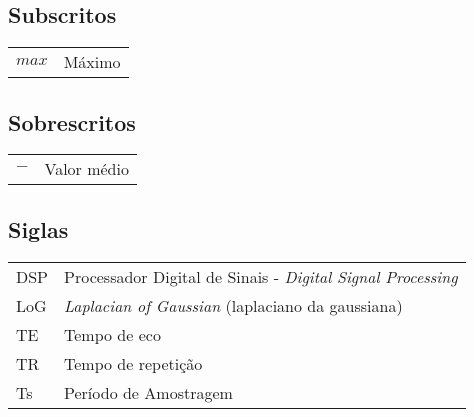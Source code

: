 \subsection*{Subscritos}

\begin{tabular}{p{}p{}}
$max$	& Máximo \\

\end{tabular}

\subsection*{Sobrescritos}

\begin{tabular}{p{}p{}}
$-$	& Valor médio
\end{tabular}

\subsection*{Siglas}

\begin{tabular}{p{}p{}}

DSP & Processador Digital de Sinais - \textit{Digital Signal Processing}\\
LoG	& \textit{Laplacian of Gaussian} (laplaciano da gaussiana)\\
TE & Tempo de eco\\
TR & Tempo de repetição\\
Ts & Período de Amostragem


\end{tabular}

